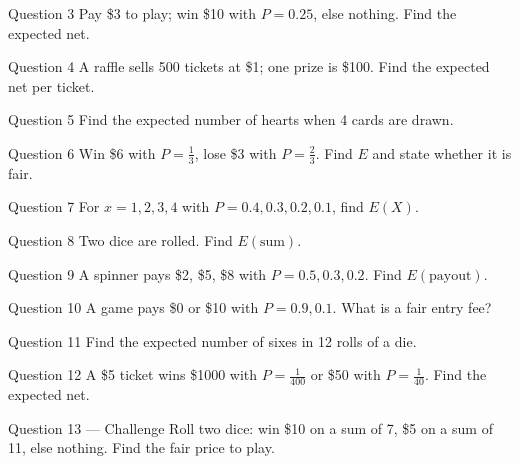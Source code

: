 \documentclass[11pt]{article}
\begin{document}
\begin{qbox}{Question 3}
Pay \$3 to play; win \$10 with $P=0.25$, else nothing. Find the expected net.\workspace{2.4cm}
\end{qbox}

\begin{qbox}{Question 4}
A raffle sells 500 tickets at \$1; one prize is \$100. Find the expected net per ticket.\workspace{2.4cm}
\end{qbox}

\begin{qbox}{Question 5}
Find the expected number of hearts when 4 cards are drawn.\workspace{2.4cm}
\end{qbox}

\begin{qbox}{Question 6}
Win \$6 with $P=\tfrac13$, lose \$3 with $P=\tfrac23$. Find $E$ and state whether it is fair.\workspace{2.4cm}
\end{qbox}

\begin{qbox}{Question 7}
For $x=1,2,3,4$ with $P=0.4,0.3,0.2,0.1$, find $E(X)$.\workspace{2.4cm}
\end{qbox}

\begin{qbox}{Question 8}
Two dice are rolled. Find $E(\text{sum})$.\workspace{2.4cm}
\end{qbox}

\begin{qbox}{Question 9}
A spinner pays \$2, \$5, \$8 with $P=0.5,0.3,0.2$. Find $E(\text{payout})$.\workspace{2.4cm}
\end{qbox}

\begin{qbox}{Question 10}
A game pays \$0 or \$10 with $P=0.9,0.1$. What is a fair entry fee?\workspace{2.4cm}
\end{qbox}

\begin{qbox}{Question 11}
Find the expected number of sixes in 12 rolls of a die.\workspace{2.4cm}
\end{qbox}

\begin{qbox}{Question 12}
A \$5 ticket wins \$1000 with $P=\tfrac{1}{400}$ or \$50 with $P=\tfrac{1}{40}$. Find the expected net.\workspace{2.4cm}
\end{qbox}

\begin{qbox}{Question 13 --- Challenge}
Roll two dice: win \$10 on a sum of 7, \$5 on a sum of 11, else nothing. Find the fair price to play.\workspace{3.2cm}
\end{qbox}
\end{document}
